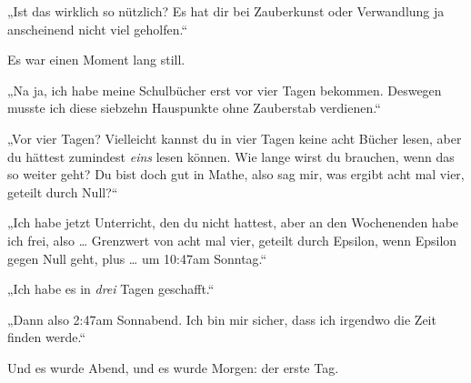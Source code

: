 „Ist das wirklich so nützlich? Es hat dir bei Zauberkunst oder Verwandlung ja anscheinend nicht viel geholfen.“

Es war einen Moment lang still.

„Na ja, ich habe meine Schulbücher erst vor vier Tagen bekommen. Deswegen musste ich diese siebzehn Hauspunkte ohne Zauberstab verdienen.“

„Vor vier Tagen? Vielleicht kannst du in vier Tagen keine acht Bücher lesen, aber du hättest zumindest \emph{eins} lesen können. Wie lange wirst du brauchen, wenn das so weiter geht? Du bist doch gut in Mathe, also sag mir, was ergibt acht mal vier, geteilt durch Null?“

„Ich habe jetzt Unterricht, den du nicht hattest, aber an den Wochenenden habe ich frei, also … Grenzwert von acht mal vier, geteilt durch Epsilon, wenn Epsilon gegen Null geht, plus … um 10:47\am am Sonntag.“

„Ich habe es in \emph{drei} Tagen geschafft.“

„Dann also 2:47\pm am Sonnabend. Ich bin mir sicher, dass ich irgendwo die Zeit finden werde.“

Und es wurde Abend, und es wurde Morgen: der erste Tag.

